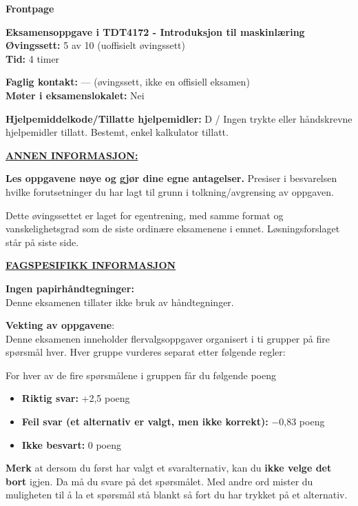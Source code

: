 \documentclass[11pt,a4paper]{article}
\begin{document}
\noindent\hspace*{-1.55em}%
{\sffamily\bfseries\fontsize{18}{22}\selectfont Frontpage}\par\vspace{1.1em}

{\bfseries Eksamensoppgave i TDT4172 - Introduksjon til maskinlæring}\\
{\bfseries Øvingssett:} 5 av 10 (uoffisielt øvingssett)\\
{\bfseries Tid:} 4 timer

\vspace{0.6em}
{\bfseries Faglig kontakt:} --- (øvingssett, ikke en offisiell eksamen)\\
{\bfseries Møter i eksamenslokalet:} Nei

\vspace{0.6em}
{\bfseries Hjelpemiddelkode/Tillatte hjelpemidler:} D / Ingen trykte eller håndskrevne hjelpemidler tillatt.
Bestemt, enkel kalkulator tillatt.

\vspace{0.6em}
{\bfseries\underline{ANNEN INFORMASJON:}}

\vspace{0.4em}
{\bfseries Les oppgavene nøye og gjør dine egne antagelser.} Presiser i besvarelsen hvilke forutsetninger du
har lagt til grunn i tolkning/avgrensing av oppgaven.

Dette øvingssettet er laget for egentrening, med samme format og vanskelighetsgrad som de
siste ordinære eksamenene i emnet. Løsningsforslaget står på siste side.

\vspace{1.6em}
{\bfseries\underline{FAGSPESIFIKK INFORMASJON}}

\vspace{0.4em}
{\bfseries Ingen papirhåndtegninger:}\\
Denne eksamenen tillater ikke bruk av håndtegninger.

\vspace{1.4em}
{\bfseries Vekting av oppgavene}:\\
Denne eksamenen inneholder flervalgsoppgaver organisert i ti grupper på fire spørsmål hver. Hver
gruppe vurderes separat etter følgende regler:

\vspace{0.6em}
For hver av de fire spørsmålene i gruppen får du følgende poeng
\begin{itemize}[leftmargin=2.2em,label=\textperiodcentered,itemsep=0pt]
\item {\bfseries Riktig svar:} +2,5 poeng
\item {\bfseries Feil svar (et alternativ er valgt, men ikke korrekt):} $-$0,83 poeng
\item {\bfseries Ikke besvart:} 0 poeng
\end{itemize}
{\bfseries Merk} at dersom du først har valgt et svaralternativ, kan du {\bfseries ikke velge det bort} igjen. Da må du
svare på det spørsmålet. Med andre ord mister du muligheten til å la et spørsmål stå blankt så fort
du har trykket på et alternativ.
\end{document}
